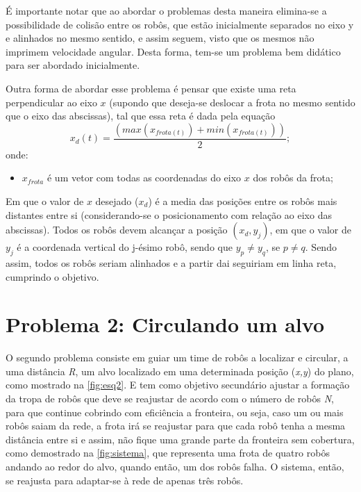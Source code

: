 É importante notar que ao abordar o problemas desta maneira elimina-se a possibilidade de colisão entre os robôs, que estão inicialmente separados no eixo y e alinhados no mesmo sentido, e assim seguem, visto que os mesmos não imprimem velocidade angular. Desta forma, tem-se um problema bem didático para ser abordado inicialmente. %

Outra forma de abordar esse problema é pensar que existe uma reta perpendicular ao eixo $x$ (supondo que deseja-se deslocar a frota no mesmo sentido que o eixo das abscissas), tal que essa reta é dada pela equação
\begin{equation}
x_{d} (t) = \dfrac{(max(x_{frota (t)}) + min(x_{frota (t)}))}{2};
\label{eq:xdp1}
\end{equation}
onde:
\begin{itemize}
	\item $x_{frota}$ é um vetor com todas as coordenadas do eixo $x$ dos robôs da frota; 
\end{itemize}
Em que o valor de $x$ desejado ($x_{d}$) é a media das posições entre os robôs mais distantes entre si (considerando-se o posicionamento com relação ao eixo das abscissas). Todos os robôs devem alcançar a posição $(x_{d},y_{j})$, em que o valor de $y_{j}$ é a coordenada vertical do j-ésimo robô, sendo que $y_{p} \neq y_{q}$, se $p \neq q$. Sendo assim, todos os robôs seriam alinhados e a partir dai seguiriam em linha reta, cumprindo o objetivo.

\section{Problema 2: Circulando um alvo}

O segundo problema consiste em guiar um time de robôs a localizar e circular, a uma distância \emph{R}, um alvo localizado em uma determinada posição (\emph{x,y}) do plano, como mostrado na \autoref{fig:esq2}. E tem como objetivo secundário ajustar a formação da tropa de robôs que deve se reajustar de acordo com o número de robôs \emph{N}, para que continue cobrindo com eficiência a fronteira, ou seja, caso um ou mais robôs saiam da rede, a frota irá se reajustar para que cada robô tenha a mesma distância entre si e assim, não fique uma grande parte da fronteira sem cobertura, como demostrado na \autoref{fig:sistema}, que representa uma frota de quatro robôs andando ao redor do alvo, quando então, um dos robôs falha. O sistema, então, se reajusta para adaptar-se à rede de apenas três robôs.

